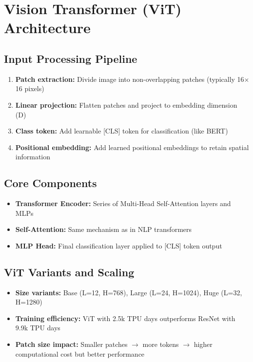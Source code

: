 \section{Vision Transformer (ViT) Architecture}

\subsection*{Input Processing Pipeline}
\begin{enumerate}
    \item \textbf{Patch extraction:} Divide image into non-overlapping patches (typically 16$\times$16 pixels)
    \item \textbf{Linear projection:} Flatten patches and project to embedding dimension (D)
    \item \textbf{Class token:} Add learnable [CLS] token for classification (like BERT)
    \item \textbf{Positional embedding:} Add learned positional embeddings to retain spatial information
\end{enumerate}

\subsection*{Core Components}
\begin{itemize}
    \item \textbf{Transformer Encoder:} Series of Multi-Head Self-Attention layers and MLPs
    \item \textbf{Self-Attention:} Same mechanism as in NLP transformers
    \item \textbf{MLP Head:} Final classification layer applied to [CLS] token output
\end{itemize}

\subsection*{ViT Variants and Scaling}
\begin{itemize}
    \item \textbf{Size variants:} Base (L=12, H=768), Large (L=24, H=1024), Huge (L=32, H=1280)
    \item \textbf{Training efficiency:} ViT with 2.5k TPU days outperforms ResNet with 9.9k TPU days
    \item \textbf{Patch size impact:} Smaller patches $\rightarrow$ more tokens $\rightarrow$ higher computational cost but better performance
\end{itemize}

